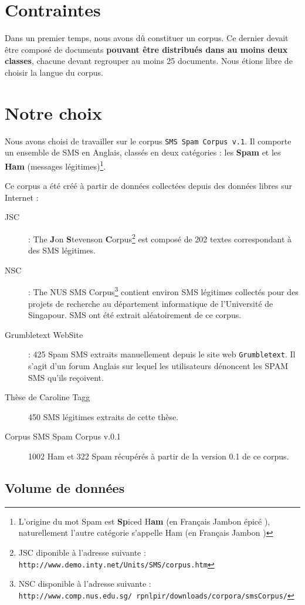 \section{Contraintes}
Dans un premier temps, nous avons dû constituer un corpus. Ce dernier devait être composé de documents \textbf{pouvant être distribués dans au moins deux classes}, chacune devant regrouper au moins 25 documents. Nous étions libre de choisir la langue du corpus.

\section{Notre choix}
Nous avons choisi de travailler sur le corpus \texttt{SMS Spam Corpus v.1}. Il comporte un ensemble de SMS en Anglais, classés en deux catégories : les \textbf{Spam} et les \textbf{Ham} (messages légitimes)\footnote{L'origine du mot Spam est \og \textbf{Sp}iced H\textbf{am} \fg{} (en Français \og Jambon épicé \fg{}), naturellement l'autre catégorie s'appelle \og Ham \fg{} (en Français \og Jambon \fg{})}.

Ce corpus a été créé à partir de données collectées depuis des données libres sur Internet :

\begin{description}
\item[JSC] : The \textbf{J}on \textbf{S}tevenson \textbf{C}orpus\footnote{JSC diponible à l'adresse suivante : \texttt{http://www.demo.inty.net/Units/SMS/corpus.htm}} est composé de 202 textes correspondant à des SMS légitimes.
\item[NSC] : The NUS SMS Corpus\footnote{NSC disponible à l'adresse suivante : \texttt{http://www.comp.nus.edu.sg/~rpnlpir/downloads/corpora/smsCorpus/}} contient environ  SMS légitimes collectés pour des projets de recherche au département informatique de l'Université de Singapour.  SMS ont été extrait aléatoirement de ce corpus.
\item[Grumbletext WebSite] : 425 Spam SMS extraits manuellement depuis le site web \texttt{Grumbletext}. Il s'agit d'un forum Anglais sur lequel les utilisateurs dénoncent les SPAM SMS qu'ils reçoivent.
\item[Thèse de Caroline Tagg] 450 SMS légitimes extraits de cette thèse.
\item[Corpus SMS Spam Corpus v.0.1] 1002 Ham et 322 Spam récupérés à partir de la version 0.1 de ce corpus.
\end{description}

\subsection*{Volume de données}

